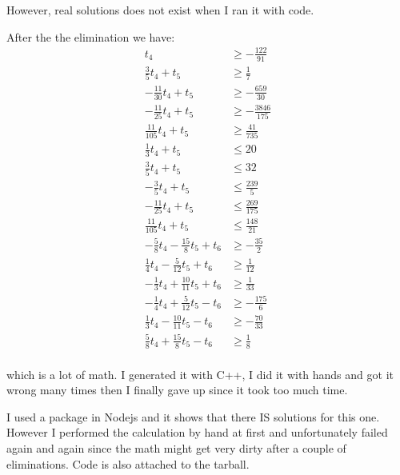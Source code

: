 \documentclass[12pt]{article}
\begin{document}

However, real solutions does not exist when I ran it with code. 

After the the  elimination we have:
\begin{equation}
  \begin{aligned}
    t_4 &\ge -\frac{122}{91}\\
    \frac{3}{5}t_4+t_5 &\ge \frac{1}{7}\\
    -\frac{11}{30}t_4+t_5&\ge -\frac{659}{30}\\
    -\frac{11}{25}t_4+t_5&\ge -\frac{3846}{175}\\
    \frac{11}{105}t_4+t_5&\ge \frac{41}{735}\\
    \frac{1}{3}t_4+t_5&\le 20\\
    \frac{3}{5}t_4+t_5&\le 32\\
    -\frac{3}{5}t_4+t_5&\le \frac{239}{5}\\
    -\frac{11}{25}t_4+t_5&\le \frac{269}{175}\\
    \frac{11}{105}t_4+t_5&\le \frac{148}{21}\\
    -\frac{5}{8}t_4-\frac{15}{8}t_5+t_6&\ge -\frac{35}{2}\\
    \frac{1}{4}t_4-\frac{5}{12}t_5+t_6&\ge \frac{1}{12}\\
    -\frac{1}{3}t_4+\frac{10}{11}t_5+t_6&\ge \frac{1}{33}\\
    -\frac{1}{4}t_4+\frac{5}{12}t_5-t_6&\ge -\frac{175}{6}\\
    \frac{1}{3}t_4-\frac{10}{11}t_5-t_6&\ge -\frac{70}{33}\\
    \frac{5}{8}t_4+\frac{15}{8}t_5-t_6&\ge \frac{1}{8}\\
  \end{aligned}
\end{equation}

which is a lot of math. I generated it with C++, I did it with hands
and got it wrong many times then I finally gave up since it took too
much time. 


I used a package in Nodejs and it shows that there IS solutions for
this one. However I performed the calculation by hand at first and
unfortunately failed again and again since the math might get very
dirty after a couple of eliminations. Code is also attached to the tarball.
\end{document}
